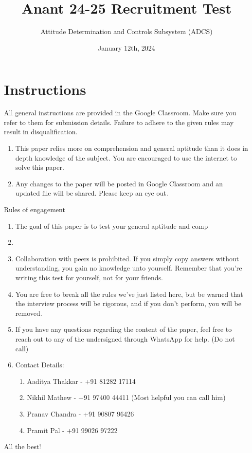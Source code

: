 \documentclass[a4paper, 12pt]{exam}
\begin{document}
	\title{Anant 24-25 Recruitment Test}
	\author{Attitude Determination and Controls Subsystem (ADCS)}
	\date{January 12th, 2024}
	\maketitle
	
	\section*{Instructions}
	All general instructions are provided in the Google Classroom. Make sure you refer to them for submission details. Failure to adhere to the given rules may result in disqualification. 
	\begin{enumerate}[]
		\item This paper relies more on comprehension and general aptitude than it does in depth knowledge of the subject. You are encouraged to use the internet to solve this paper.
		\item Any changes to the paper will be posted in Google Classroom and an updated file will be shared. Please keep an eye out.
	\end{enumerate}
	Rules of engagement
	\begin{enumerate}
		\item The goal of this paper is to test your general aptitude and comp
		\item 
		\item Collaboration with peers is prohibited. If you simply copy answers without understanding, you gain no knowledge unto yourself. Remember that you're writing this test for yourself, not for your friends. 
		\item You are free to break all the rules we've just listed here, but be warned that the interview process will be rigorous, and if you don't perform, you will be removed.
		\item If you have any questions regarding the content of the paper, feel free to reach out to any of the undersigned through WhatsApp for help. (Do not call)
		\item Contact Details:
		\begin{enumerate}
			\item Aaditya Thakkar - +91 81282 17114
			\item Nikhil Mathew - +91 97400 44411 (Most helpful you can call him)
			\item Pranav Chandra - +91 90807 96426
			\item Pramit Pal - +91 99026 97222
		\end{enumerate}
	\end{enumerate}
	\begin{center}
		All the best!
	\end{center}
		
\end{document}

